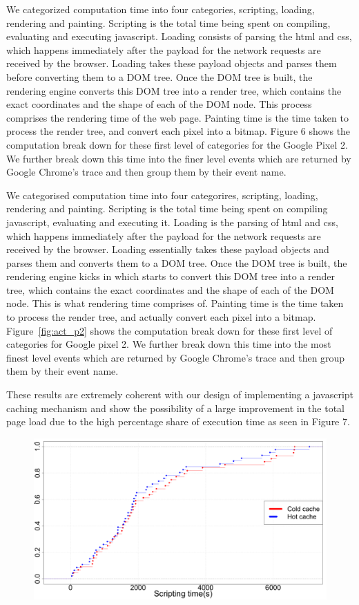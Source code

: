 We categorized computation time into four categories, scripting, loading, rendering and
painting. Scripting is the total time being spent on
compiling, evaluating and executing javascript. Loading consists of parsing the html and css, which happens 
immediately after the payload for the network requests are received by the browser. Loading
takes these payload objects and parses them before converting them to a DOM tree. Once the DOM tree is built,
the rendering engine converts this DOM tree into a render tree, which contains the
exact coordinates and the shape of each of the DOM node. This process comprises the rendering time of the web page.
Painting time is the time taken to process the render tree, and convert
each pixel into a bitmap.
Figure 6 shows the computation break down for these first level of categories
for the Google Pixel 2. We further break down this time into the finer level events
which are returned by Google Chrome's trace and then group them by their event name.

We categorised computation time into four categorires, scripting,
loading, rendering and painting. Scripting is the total time being
spent on compiling javascript, evaluating and executing it. Loading is
the parsing of html and css, which happens immediately after the
payload for the network requests are received by the browser. Loading
essentially takes these payload objects and parses them and converts
them to a DOM tree. Once the DOM tree is built, the rendering engine
kicks in which starts to convert this DOM tree into a render tree,
which contains the exact coordinates and the shape of each of the DOM
node. This is what rendering time comprises of.  Painting time is the
time taken to process the render tree, and actually convert each pixel
into a bitmap.  Figure~\ref{fig:act_p2} shows the computation break
down for these first level of categories for Google pixel 2. We
further break down this time into the most finest level events which
are returned by Google Chrome's trace and then group them by their
event name.

These results are extremely coherent with our design of implementing a javascript 
caching mechanism and show the possibility of a large improvement in the total page
load due to the high percentage share of execution time as seen in Figure 7. 

\begin{figure}[t]
\centering
\includegraphics[width=0.9\columnwidth]{figs/chrome_script.png}
\label{fig:scripting_p2}
\end{figure}

